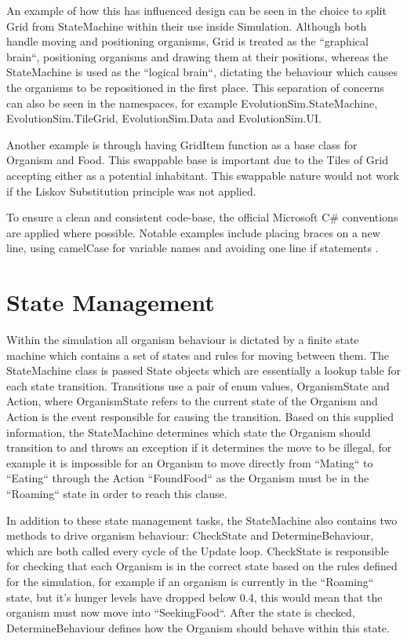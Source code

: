 \documentclass[a4paper, oneside, 11pt]{report}
\begin{document}
An example of how this has influenced design can be seen in the choice to split Grid from StateMachine within their use inside Simulation. Although both handle moving and positioning organisms, Grid is treated as the ``graphical brain``, positioning organisms and drawing them at their positions, whereas the StateMachine is used as the ``logical brain``, dictating the behaviour which causes the organisms to be repositioned in the first place. This separation of concerns can also be seen in the namespaces, for example EvolutionSim.StateMachine, EvolutionSim.TileGrid, EvolutionSim.Data and EvolutionSim.UI.

Another example is through having GridItem function as a base class for Organism and Food. This swappable base is important due to the Tiles of Grid accepting either as a potential inhabitant. This swappable nature would not work if the Liskov Substitution principle was not applied.

To ensure a clean and consistent code-base, the official Microsoft C\# conventions are applied where possible. Notable examples include placing braces on a new line, using camelCase for variable names and avoiding one line if statements \cite{microsoft}.

\section{State Management}\label{statemanagement}
Within the simulation all organism behaviour is dictated by a finite state machine which contains a set of states and rules for moving between them. The StateMachine class is passed State objects which are essentially a lookup table for each state transition. Transitions use a pair of enum values, OrganismState and Action, where OrganismState refers to the current state of the Organism and Action is the event responsible for causing the transition. Based on this supplied information, the StateMachine determines which state the Organism should transition to and throws an exception if it determines the move to be illegal, for example it is impossible for an Organism to move directly from ``Mating`` to ``Eating`` through the Action ``FoundFood`` as the Organism must be in the ``Roaming`` state in order to reach this clause.

In addition to these state management tasks, the StateMachine also contains two methods to drive organism behaviour: CheckState and DetermineBehaviour, which are both called every cycle of the Update loop. CheckState is responsible for checking that each Organism is in the correct state based on the rules defined for the simulation, for example if an organism is currently in the ``Roaming`` state, but it's hunger levels have dropped below 0.4, this would mean that the organism must now move into ``SeekingFood``. After the state is checked, DetermineBehaviour defines how the Organism should behave within this state.
\end{document}
